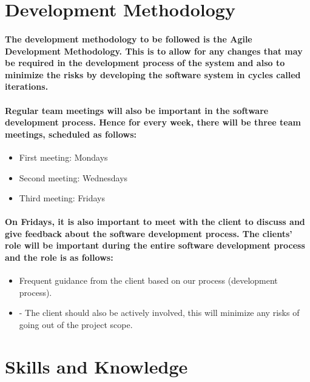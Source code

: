 \documentclass{article}
\begin{document}
\section{Development Methodology}

\paragraph{The development methodology to be followed is the Agile Development Methodology. This is to allow for any changes that may be required in the development process of the system and also to minimize the risks by developing the software system in cycles called iterations.}

\paragraph{Regular team meetings will also be important in the software development process. Hence for every week, there will be three team meetings, scheduled as follows:}

\begin{itemize}
\item First meeting: Mondays
\item Second meeting: Wednesdays
\item Third meeting: Fridays
\end{itemize}

\paragraph{On Fridays, it is also important to meet with the client to discuss and give feedback about the software development process. The clients’ role will be important during the entire software development process and the role is as follows:}

\begin{itemize}
\item Frequent guidance from the client based on our process (development process).
\item -	The client should also be actively involved, this will minimize any risks of going out of the project scope.
\end{itemize}

\section{Skills and Knowledge}
\end{document}

